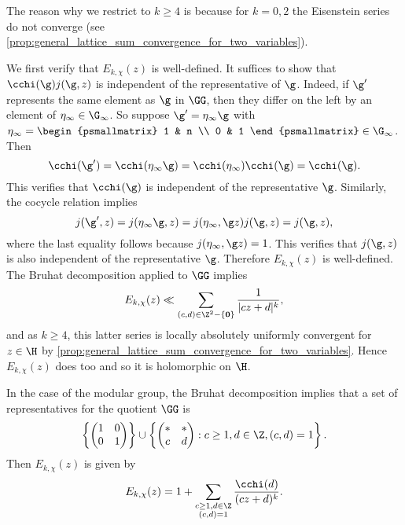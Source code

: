     \begin{remark}
      The reason why we restrict to $k \ge 4$ is because for $k = 0,2$ the Eisenstein series do not converge (see \cref{prop:general_lattice_sum_convergence_for_two_variables}).
    \end{remark}

    We first verify that $E_{k,\chi}(z)$ is well-defined. It suffices to show that $\cchi(\g)j(\g,z)$ is independent of the representative of $\g$. Indeed, if $\g'$ represents the same element as $\g$ in $\GG$, then they differ on the left by an element of $\eta_{\infty} \in \G_{\infty}$. So suppose $\g' = \eta_{\infty}\g$ with $\eta_{\infty} = \begin{psmallmatrix} 1 & n \\ 0 & 1 \end{psmallmatrix} \in \G_{\infty}$. Then
    \[
      \cchi(\g') = \cchi(\eta_{\infty}\g) = \cchi(\eta_{\infty})\cchi(\g) = \cchi(\g).
    \]
    This verifies that $\cchi(\g)$ is independent of the representative $\g$. Similarly, the cocycle relation implies
    \[
      j(\g',z) = j(\eta_{\infty}\g,z) = j(\eta_{\infty},\g z)j(\g,z) = j(\g,z),
    \]
    where the last equality follows because $j(\eta_{\infty},\g z) = 1$. This verifies that $j(\g,z)$ is also independent of the representative $\g$. Therefore $E_{k,\chi}(z)$ is well-defined. The Bruhat decomposition applied to $\GG$ implies
    \[
      E_{k,\chi}(z) \ll \sum_{(c,d) \in \Z^{2}-\{\mathbf{0}\}}\frac{1}{|cz+d|^{k}},
    \]
    and as $k \ge 4$, this latter series is locally absolutely uniformly convergent for $z \in \H$ by \cref{prop:general_lattice_sum_convergence_for_two_variables}. Hence $E_{k,\chi}(z)$ does too and so it is holomorphic on $\H$.

    \begin{remark}\label{rem:Eisenstein_series_on_modular_group}
      In the case of the modular group, the Bruhat decomposition implies that a set of representatives for the quotient $\GG$ is
    \[
      \left\{\begin{pmatrix} 1 & 0 \\ 0 & 1 \end{pmatrix}\right\} \cup \left\{\begin{pmatrix} \ast & \ast \\ c & d \end{pmatrix}:c \ge 1, d \in \Z, (c,d) = 1\right\}.
    \]
    Then $E_{k,\chi}(z)$ is given by
      \[
        E_{k,\chi}(z) = 1+\sum_{\substack{c \ge 1, d \in \Z \\ (c,d) = 1}}\frac{\cchi(d)}{(cz+d)^{k}}.
      \]
    \end{remark}

